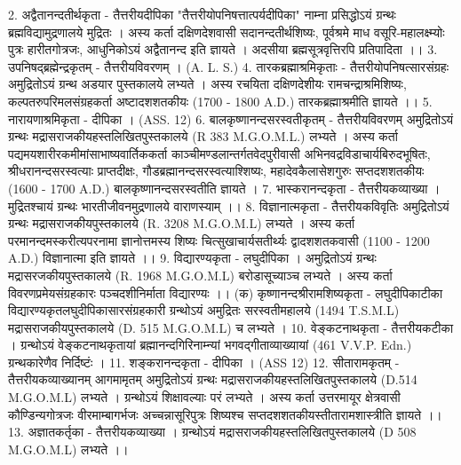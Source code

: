 2. अद्वैतानन्दतीर्थकृता - तैत्तरीयदीपिका 
"तैत्तरीयोपनिषत्तात्पर्यदीपिका" नाम्ना प्रसिद्धोऽयं ग्रन्थः ब्रह्मविद्यामुद्रणालये मुद्रितः । अस्य कर्ता दक्षिणदेशवासी सदानन्दतीर्थशिष्यः, पूर्वश्रमे माध वसूरि-महालक्ष्म्योः पुत्रः हारीतगोत्रजः, आधुनिकोऽयं अद्वैतानन्द इति ज्ञायते । अदसीया ब्रह्मसूत्रवृत्तिरपि प्रतिपादिता ।। 
3. उपनिषद्ब्रह्मेन्द्रकृतम् - तैत्तरीयविवरणम् ।  (A. L. S.)
4. तारकब्रह्माश्रमिकृताः - तैत्तरीयोपनिषत्सारसंग्रहः
अमुद्रितोऽयं ग्रन्थ अडयार पुस्तकालये लभ्यते । अस्य रचयिता दक्षिणदेशीयः रामचन्द्राश्रमिशिष्यः, कल्पतरुपरिमलसंग्रहकर्ता अष्टादशशतकीयः (1700 - 1800 A.D.) तारकब्रह्माश्रमीति ज्ञायते ।। 
5. नारायणाश्रमिकृता - दीपिका । (ASS. 12)  
6. बालकृष्णानन्दसरस्वतीकृतम् - तैत्तरीयविवरणम् 
अमुद्रितोऽयं ग्रन्थः मद्रासराजकीयहस्तलिखितपुस्तकालये (R 383 M.G.O.M.L.) लभ्यते । अस्य कर्ता पद्यमयशारीरकमीमांसाभाष्यवार्तिककर्ता काञ्चीमण्डलान्तर्गतवेदपुरीवासी अभिनवद्रविडाचार्यबिरुदभूषितः, श्रीधरानन्दसरस्वत्याः प्राप्तदीक्षः, गौडब्रह्मानन्दसरस्वत्याश्शिष्यः, महादेवकैलासेशगुरुः सप्तदशशतकीयः (1600 - 1700 A.D.) बालकृष्णानन्दसरस्वतीति ज्ञायते ।
7. भास्करानन्दकृता - तैत्तरीयकव्याख्या । मुद्रितश्चायं ग्रन्थः भारतीजीवनमुद्रणालये वाराणस्याम् ।।
8.  विज्ञानात्मकृता - तैत्तरीयकविवृतिः 
अमुद्रितोऽयं ग्रन्थः मद्रासराजकीयपुस्तकालये (R. 3208 M.G.O.M.L) लभ्यते । अस्य कर्ता परमानन्दमस्करीत्यपरनामा ज्ञानोत्तमस्य शिष्यः चित्सुखाचार्यसतीर्थ्यः द्वादशशतकवासी (1100 - 1200 A.D.) विज्ञानात्मा इति ज्ञायते ।।
9. विद्यारण्यकृता - लघुदीपिका । अमुद्रितोऽयं ग्रन्थः मद्रासरजकीयपुस्तकालये (R. 1968 M.G.O.M.L) बरोडासूच्याञ्च लभ्यते । अस्य कर्ता विवरणप्रमेयसंग्रहकारः पञ्चदशीनिर्माता विद्यारण्यः ।।
(क) कृष्णानन्दश्रीरामशिष्यकृता - लघुदीपिकाटीका 
विद्यारण्यकृतलघुदीपिकासारसंग्रहकारी ग्रन्थोऽयं अमुद्रितः सरस्वतीमहालये (1494 T.S.M.L) मद्रासराजकीयपुस्तकालये (D. 515 M.G.O.M.L) च लभ्यते । 
10. वेङ्कटनाथकृता - तैत्तरीयकटीका । ग्रन्थोऽयं वेङ्कटनाथकृतायां ब्रह्मानन्दगिरिनाम्न्यां भगवद्गीताव्याख्यायां (461 V.V.P. Edn.) ग्रन्थकारेणैव निर्दिष्टंः । 
11. शङ्करानन्दकृता - दीपिका । (ASS 12)
12. सीतारामकृतम् - तैत्तरीयकव्याख्यानम् आगमामृतम् 
अमुद्रितोऽयं ग्रन्थः मद्रासराजकीयहस्तलिखितपुस्तकालये (D.514 M.G.O.M.L) लभ्यते । ग्रन्थोऽयं शिक्षावल्याः परं लभ्यते । अस्य कर्ता उत्तरमायूर क्षेत्रवासी कौण्डिन्यगोत्रजः वीरमाम्बागर्भजः अच्चन्नासूरिपुत्रः शिष्यश्च सप्तदशशतकीयस्तीतारामशास्त्रीति ज्ञायते ।। 
13. अज्ञातकर्तृका - तैत्तरीयकव्याख्या । ग्रन्थोऽयं मद्रासराजकीयहस्तलिखितपुस्तकालये (D 508 M.G.O.M.L) लभ्यते ।। 



